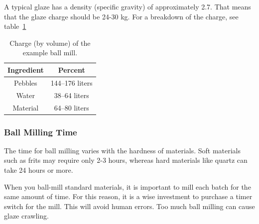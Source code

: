 A typical glaze has a density (specific gravity) of approximately 2.7. That 
means that the glaze charge should be 24-30 kg. For a breakdown of the charge, 
see table~\ref{tab:chargeexample}
\begin{center}
          \renewcommand{\arraystretch}{1.5}
  \begin{table}\centering
    \begin{tabular}{|c|c|}\hline
      \textbf{Ingredient}&\textbf{Percent}\\\hline\hline
      Pebbles&144--176 liters\\\hline
      Water&38--64 liters\\\hline
      Material&64--80 liters\\\hline
    \end{tabular}
    \caption{Charge (by volume) of the example ball mill.}
    \label{tab:chargeexample}
  \end{table}
\end{center}
\subsubsection{Ball Milling Time}
The time for ball milling varies with the hardness of materials. Soft materials 
such as frits may require only 2-3 hours, whereas hard materials like quartz 
can take 24 hours or more.

When you ball-mill standard materials, it is important to mill each batch for 
the same amount of time. For this reason, it is a wise investment to purchase a 
timer switch for the mill. This will avoid human errors. Too much ball milling 
can cause glaze crawling.
